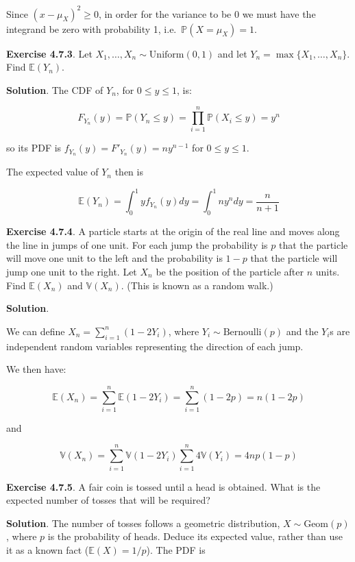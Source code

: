 Since \((x - \mu_X)^{2} \geq 0\), in order for the variance to be 0 we
must have the integrand be zero with probability 1,
i.e.~\(\mathbb{P}(X = \mu_X) = 1\).

\textbf{Exercise 4.7.3}. Let
\(X_{1}, \dots, X_{n} \sim \text{Uniform}(0, 1)\) and let
\(Y_{n} = \max \{ X_{1}, \dots, X_{n} \}\). Find \(\mathbb{E}(Y_{n})\).

\textbf{Solution}. The CDF of \(Y_{n}\), for \(0 \leq y \leq 1\), is:

\[ F_{Y_{n}}(y) = \mathbb{P}(Y_{n} \leq y) = \prod_{i=1}^{n} \mathbb{P}(X_{i} \leq y) = y^{n} \]

so its PDF is \(f_{Y_{n}}(y) = F'_{Y_{n}}(y) = n y^{n-1}\) for
\(0 \leq y \leq 1\).

The expected value of \(Y_{n}\) then is

\[ \mathbb{E}(Y_{n}) = \int_{0}^{1} y f_{Y_{n}}(y) dy = \int_{0}^{1} n y^{n} dy = \frac{n}{n+1} \]

\textbf{Exercise 4.7.4}. A particle starts at the origin of the real
line and moves along the line in jumps of one unit. For each jump the
probability is \(p\) that the particle will move one unit to the left
and the probability is \(1 - p\) that the particle will jump one unit to
the right. Let \(X_{n}\) be the position of the particle after \(n\)
units. Find \(\mathbb{E}(X_{n})\) and \(\mathbb{V}(X_{n})\). (This is known
as a random walk.)

\textbf{Solution}.

We can define \(X_{n} = \sum_{i=1}^{n} (1 - 2Y_{i})\), where
\(Y_{i} \sim \text{Bernoulli}(p)\) and the \(Y_{i}\)s are independent
random variables representing the direction of each jump.

We then have:

\[ \mathbb{E}(X_{n}) = \sum_{i=1}^{n} \mathbb{E}(1 - 2Y_{i}) = \sum_{i=1}^{n} (1 - 2p) = n(1 - 2p) \]

and

\[ \mathbb{V}(X_{n}) = \sum_{i=1}^{n} \mathbb{V}(1 - 2Y_{i}) \sum_{i=1}^{n} 4\mathbb{V}(Y_{i}) = 4np(1 - p) \]

\textbf{Exercise 4.7.5}. A fair coin is tossed until a head is obtained.
What is the expected number of tosses that will be required?

\textbf{Solution}. The number of tosses follows a geometric
distribution, \(X \sim \text{Geom}(p)\), where \(p\) is the probability
of heads. Deduce its expected value, rather than use it as a known
fact (\(\mathbb{E}(X) = 1/p\)). The PDF is

